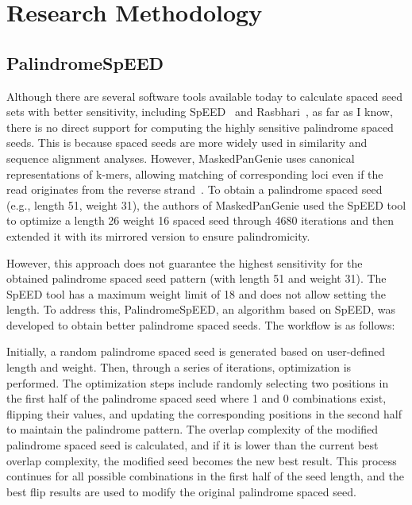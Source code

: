 \documentclass{PHlab-thesis}
\begin{document}
\chapter{Research Methodology}
\section{PalindromeSpEED}
Although there are several software tools available today to calculate spaced seed sets with better sensitivity, including SpEED~\cite{Lucian2011SpEED} and Rasbhari~\cite{Hahn2016Rasbhari}, as far as I know, there is no direct support for computing the highly sensitive palindrome spaced seeds. This is because spaced seeds are more widely used in similarity and sequence alignment analyses. However, MaskedPanGenie uses canonical representations of k-mers, allowing matching of corresponding loci even if the read originates from the reverse strand~\cite{haimo2023MaskedPanGenie}. To obtain a palindrome spaced seed (e.g., length 51, weight 31), the authors of MaskedPanGenie used the SpEED tool to optimize a length 26 weight 16 spaced seed through 4680 iterations and then extended it with its mirrored version to ensure palindromicity.

However, this approach does not guarantee the highest sensitivity for the obtained palindrome spaced seed pattern (with length 51 and weight 31). The SpEED tool has a maximum weight limit of 18 and does not allow setting the length. To address this, PalindromeSpEED, an algorithm based on SpEED, was developed to obtain better palindrome spaced seeds. The workflow is as follows:

Initially, a random palindrome spaced seed is generated based on user-defined length and weight. Then, through a series of iterations, optimization is performed. The optimization steps include randomly selecting two positions in the first half of the palindrome spaced seed where 1 and 0 combinations exist, flipping their values, and updating the corresponding positions in the second half to maintain the palindrome pattern. The overlap complexity of the modified palindrome spaced seed is calculated, and if it is lower than the current best overlap complexity, the modified seed becomes the new best result. This process continues for all possible combinations in the first half of the seed length, and the best flip results are used to modify the original palindrome spaced seed.
\end{document}
